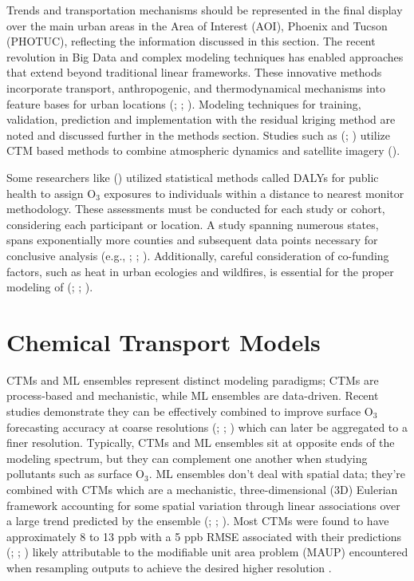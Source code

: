 Trends and transportation mechanisms should be represented in the final display over the main urban areas in the Area of Interest (AOI), Phoenix and Tucson (PHOTUC), reflecting the information discussed in this section. The recent revolution in Big Data and complex modeling techniques has enabled approaches that extend beyond traditional linear frameworks. These innovative methods incorporate transport, anthropogenic, and thermodynamical mechanisms into feature bases for urban locations (\cite{chiacchiaretta_inland_2024}; \cite{gagliardi_machine_2020}; \cite{yu_errors_2018}). Modeling techniques for training, validation, prediction and implementation with the residual kriging method are noted and discussed further in the methods section. Studies such as (\cite{yu_errors_2018}; \cite{zhou_coupling_2018}) utilize CTM based methods to combine atmospheric dynamics and satellite imagery (\cite{lin_intercomparison_2024}). 

Some researchers like (\cite{rovira_air_2020}) utilized statistical methods called DALYs for public health to assign O$_3$ exposures to individuals within a distance to nearest monitor methodology. These assessments must be conducted for each study or cohort, considering each participant or location. A study spanning numerous states, spans exponentially more counties and subsequent data points necessary for conclusive analysis (e.g., \cite{chen_association_2023}; \cite{gogna_cohort_2024}; \cite{rovira_air_2020}).  Additionally, careful consideration of co-funding factors, such as heat in urban ecologies and wildfires, is essential for the proper modeling of  (\cite{lee_wildfire_2024}; \cite{reid_role_2012}; \cite{watson_machine_2019}).
\section{Chemical Transport Models} \label{litreview:ctms} CTMs and ML ensembles represent distinct modeling paradigms; CTMs are process-based and mechanistic, while ML ensembles are data-driven. Recent studies demonstrate they can be effectively combined to improve surface O$_3$ forecasting accuracy at coarse resolutions (\cite{sun_improvement_2021}; \cite{yu_errors_2018}; \cite{cheng_improvement_2022}) which can later be aggregated to a finer resolution. Typically, CTMs and ML ensembles sit at opposite ends of the modeling spectrum, but they can complement one another when studying pollutants such as surface O$_3$. ML ensembles don’t deal with spatial data; they’re combined with CTMs which are a mechanistic, three-dimensional (3D) Eulerian framework accounting for some spatial variation through linear associations over a large trend predicted by the ensemble (\cite{balamurugan_tropospheric_2021}; \cite{travis_systematic_2019}; \cite{kang_estimation_2021}). Most CTMs were found to have approximately 8 to 13 ppb with a 5 ppb RMSE associated with their predictions (\cite{kalbande_machine_2023}; \cite{travis_systematic_2019}; \cite{wang_novel_2020}) likely attributable to the modifiable unit area problem (MAUP) encountered when resampling outputs to achieve the desired higher resolution \cite{manley2014}. 

